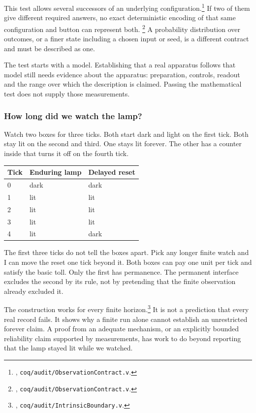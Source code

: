 \documentclass[11pt,twoside]{article}
\theoremstyle{thielethm}
\theoremstyle{thieledef}
\theoremstyle{thieledef}
\theoremstyle{thieledef}
\theoremstyle{thielethm}
\theoremstyle{thieleobs}
\theoremstyle{thielethm}
\begin{document}
This test allows several successors of an underlying configuration.\footnote{
, \texttt{coq/audit/ObservationContract.v}.} If two of them give different
required answers, no exact deterministic encoding of that same
configuration and button can represent both. \footnote{,\newline
\texttt{coq/audit/ObservationContract.v}.}
A probability distribution over outcomes, or a finer state including a
chosen input or seed, is a different contract and must be described as one.

The test starts with a model. Establishing that a real apparatus follows
that model still needs evidence about the apparatus: preparation, controls,
readout and the range over which the description is claimed. Passing the
mathematical test does not supply those measurements.

\subsubsection*{How long did we watch the lamp?}

Watch two boxes for three ticks. Both start dark and light on the first tick.
Both stay lit on the second and third. One stays lit forever. The other
has a counter inside that turns it off on the fourth tick.

\begin{center}
\begin{tabular}{@{}lll@{}}
Tick & Enduring lamp & Delayed reset \\ \hline
0 & dark & dark \\
1 & lit & lit \\
2 & lit & lit \\
3 & lit & lit \\
4 & lit & dark \\ \hline
\end{tabular}
\end{center}

The first three ticks do not tell the boxes apart. Pick any longer finite
watch and I can move the reset one tick beyond it. Both boxes can pay one
unit per tick and satisfy the basic toll. Only the first has permanence.
The permanent interface excludes the second by its rule, not by pretending
that the finite observation already excluded it.

The construction works for every finite horizon.\footnote{
,
\texttt{coq/audit/IntrinsicBoundary.v}.} It is not a prediction that every
real record fails. It shows why a finite run alone cannot establish an
unrestricted forever claim. A proof from an adequate mechanism, or an
explicitly bounded reliability claim supported by measurements, has work
to do beyond reporting that the lamp stayed lit while we watched.
\end{document}
